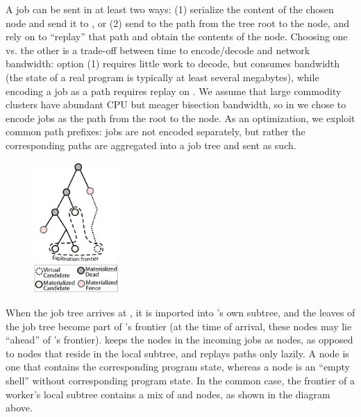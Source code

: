 A job can be sent in at least two ways: (1) serialize the content of the chosen node and send it to \wdst, or (2) send to \wdst the path from the tree root to the node, and rely on \wdst to ``replay'' that path and obtain the contents of the node.  Choosing one vs. the other is a trade-off between time to encode/decode and network bandwidth: option (1) requires little work to decode, but consumes bandwidth (the state of a real program is typically at least several megabytes), while encoding a job as a path requires replay on \wdst.  We assume that large commodity clusters have abundant CPU but meager bisection bandwidth,
so in \cnine we chose to encode jobs as the path from the root to the \candidate node.  As an optimization, we exploit common path prefixes: jobs are not encoded separately, but rather the corresponding paths are aggregated into a job tree and sent as such.

\begin{figure}
\vspace{-5mm}
%
\hspace{-10mm}\includegraphics[height=50mm]{figures/parsymbex/worker-tree-thumb}
\vspace{-8mm}
\end{figure}

When the job tree arrives at \wdst, it is imported into \wdst's own subtree, and the leaves of the job tree become part of \wdst's frontier (at the time of arrival, these nodes may lie ``ahead'' of \wdst's frontier).  \wdst keeps the nodes in the incoming jobs as {\em \virtual} nodes, as opposed to {\em \materialized} nodes that reside in the local subtree, and replays paths only lazily.  A \materialized node is one that contains the corresponding program state, whereas a \virtual node is an ``empty shell'' without corresponding program state.  In the common case, the frontier of a worker's local subtree contains a mix of \materialized and \virtual nodes, as shown in the diagram above.

